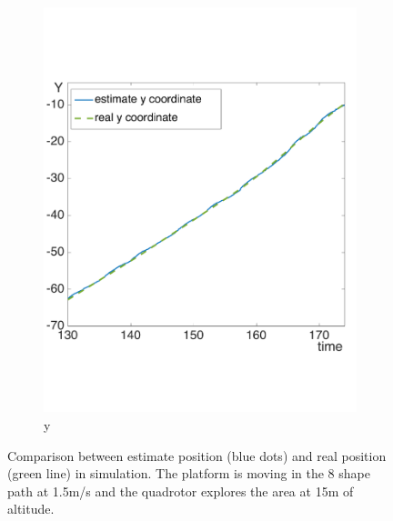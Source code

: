 \begin{figure}[!htbp]
\begin{subfigure}[b]{0.32\textwidth}
        \includegraphics[width=\textwidth]{img/high_altitude_error_y.pdf}
        \caption{y}
        \label{fig:two}
   \end{subfigure}
  \caption{Comparison between estimate position (blue dots) and real position (green line) in simulation. The platform is moving in the 8 shape path at 1.5m/s and the quadrotor explores the area at 15m of altitude.}
  \label{fig:ekf_high_altitude_comparison}
\end{figure} 

